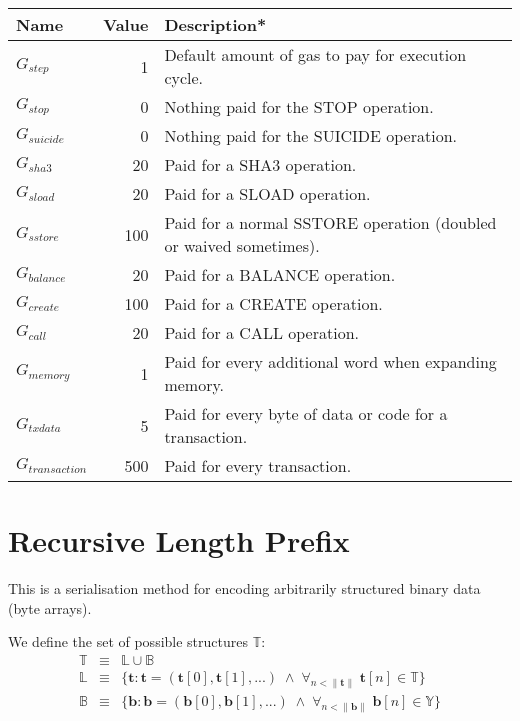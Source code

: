 \documentclass[9pt,oneside]{amsart}
\begin{document}
\begin{tabular*}{\columnwidth}[h]{lrl}
\toprule
Name & Value & Description* \\
\midrule
$G_{step}$ & 1 & Default amount of gas to pay for execution cycle. \\
$G_{stop}$ & 0 & Nothing paid for the {\small STOP} operation. \\
$G_{suicide}$ & 0 & Nothing paid for the {\small SUICIDE} operation. \\
$G_{sha3}$ & 20 & Paid for a {\small SHA3} operation. \\
$G_{sload}$ & 20 & Paid for a {\small SLOAD} operation. \\
$G_{sstore}$ & 100 & Paid for a normal {\small SSTORE} operation (doubled or waived sometimes). \\
$G_{balance}$ & 20 & Paid for a {\small BALANCE} operation. \\
$G_{create}$ & 100 & Paid for a {\small CREATE} operation. \\
$G_{call}$ & 20 & Paid for a {\small CALL} operation. \\
$G_{memory}$ & 1 & Paid for every additional word when expanding memory. \\
$G_{txdata}$ & 5 & Paid for every byte of data or code for a transaction. \\
$G_{transaction}$ & 500 & Paid for every transaction. \\
\bottomrule
\end{tabular*}

\section{Recursive Length Prefix}\label{app:rlp}
This is a serialisation method for encoding arbitrarily structured binary data (byte arrays).

We define the set of possible structures $\mathbb{T}$:
\begin{eqnarray}
\mathbb{T} & \equiv & \mathbb{L} \cup \mathbb{B} \\
\mathbb{L} & \equiv & \{ \mathbf{t}: \mathbf{t} = ( \mathbf{t}[0], \mathbf{t}[1], ... ) \; \wedge \; \forall_{n < \lVert \mathbf{t} \rVert} \; \mathbf{t}[n] \in \mathbb{T} \} \\
\mathbb{B} & \equiv & \{ \mathbf{b}: \mathbf{b} = ( \mathbf{b}[0], \mathbf{b}[1], ... ) \; \wedge \; \forall_{n < \lVert \mathbf{b} \rVert} \; \mathbf{b}[n] \in \mathbb{Y} \}
\end{eqnarray}
\end{document}
